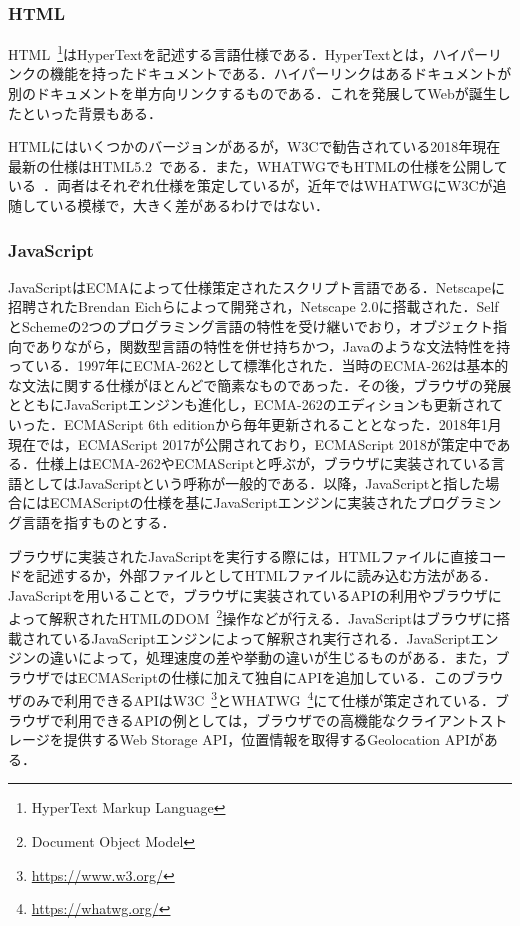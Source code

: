 \subsubsection{HTML}
HTML~\footnote{HyperText Markup Language}はHyperTextを記述する言語仕様である．HyperTextとは，ハイパーリンクの機能を持ったドキュメントである．ハイパーリンクはあるドキュメントが別のドキュメントを単方向リンクするものである．これを発展してWebが誕生したといった背景もある．

HTMLにはいくつかのバージョンがあるが，W3Cで勧告されている2018年現在最新の仕様はHTML5.2~\cite{html5_2}である．また，WHATWGでもHTMLの仕様を公開している~\cite{html_ls}．両者はそれぞれ仕様を策定しているが，近年ではWHATWGにW3Cが追随している模様で，大きく差があるわけではない．
\subsubsection{JavaScript}
JavaScriptはECMAによって仕様策定されたスクリプト言語である．Netscapeに招聘されたBrendan Eichらによって開発され，Netscape 2.0に搭載された．SelfとSchemeの2つのプログラミング言語の特性を受け継いでおり，オブジェクト指向でありながら，関数型言語の特性を併せ持ちかつ，Javaのような文法特性を持っている．1997年にECMA-262として標準化された．当時のECMA-262は基本的な文法に関する仕様がほとんどで簡素なものであった．その後，ブラウザの発展とともにJavaScriptエンジンも進化し，ECMA-262のエディションも更新されていった．ECMAScript 6th editionから毎年更新されることとなった．2018年1月現在では，ECMAScript 2017が公開されており，ECMAScript 2018が策定中である．仕様上はECMA-262やECMAScriptと呼ぶが，ブラウザに実装されている言語としてはJavaScriptという呼称が一般的である．以降，JavaScriptと指した場合にはECMAScriptの仕様を基にJavaScriptエンジンに実装されたプログラミング言語を指すものとする．

ブラウザに実装されたJavaScriptを実行する際には，HTMLファイルに直接コードを記述するか，外部ファイルとしてHTMLファイルに読み込む方法がある．JavaScriptを用いることで，ブラウザに実装されているAPIの利用やブラウザによって解釈されたHTMLのDOM~\footnote{Document Object Model}操作などが行える．JavaScriptはブラウザに搭載されているJavaScriptエンジンによって解釈され実行される．JavaScriptエンジンの違いによって，処理速度の差や挙動の違いが生じるものがある．また，ブラウザではECMAScriptの仕様に加えて独自にAPIを追加している．このブラウザのみで利用できるAPIはW3C~\footnote{\url{https://www.w3.org/}}とWHATWG~\footnote{\url{https://whatwg.org/}}にて仕様が策定されている．ブラウザで利用できるAPIの例としては，ブラウザでの高機能なクライアントストレージを提供するWeb Storage API，位置情報を取得するGeolocation APIがある．
